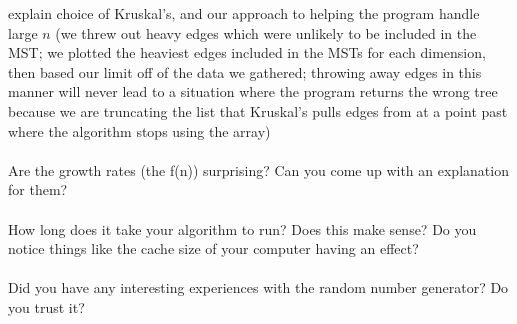 \documentclass[solution, letterpaper]{cs121}
\begin{document}
explain choice of Kruskal's, and our approach to helping the program handle large $n$ (we threw out heavy edges which were unlikely to be included in the MST; we plotted the heaviest edges included in the MSTs for each dimension, then based our limit off of the data we gathered; throwing away edges in this manner will never lead to a situation where the program returns the wrong tree because we are truncating the list that Kruskal's pulls edges from at a point past where the algorithm stops using the array)\\ \\
Are the growth rates (the f(n)) surprising? Can you come up with an explanation for them? \\ \\
How long does it take your algorithm to run? Does this make sense? Do you notice things like the cache size of your computer having an effect? \\ \\
Did you have any interesting experiences with the random number generator? Do you trust it? \\ \\
\end{document}
